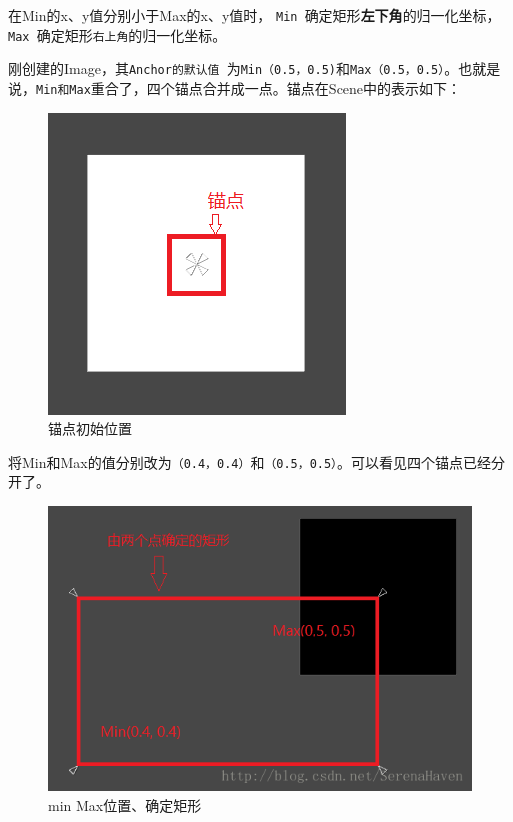 \documentclass[UTF8,a4paper,12pt]{ctexbook}
\begin{document}
			在Min的x、y值分别小于Max的x、y值时，
			\verb|Min |确定矩形\textbf{左下角}的归一化坐标，\verb|Max |确定矩形\verb|右上角|的归一化坐标。
			
			刚创建的Image，其\verb|Anchor的默认值 |为\verb|Min（0.5，0.5)|和\verb|Max（0.5，0.5）|。也就是说，\verb|Min和Max|重合了，四个锚点合并成一点。锚点在Scene中的表示如下：
			
			\begin{figure}[H]
				\centering
				\includegraphics[scale=0.7]{anchorFirst.png}
				\caption{锚点初始位置}
			\end{figure}
		
			将Min和Max的值分别改为\verb|（0.4，0.4）|和\verb|（0.5，0.5）|。可以看见四个锚点已经分开了。
			
			\begin{figure}[H]
				\centering
				\includegraphics[scale=0.5]{anchorChange.png}
				\caption{min Max位置、确定矩形}
			\end{figure}
			
\end{document}
